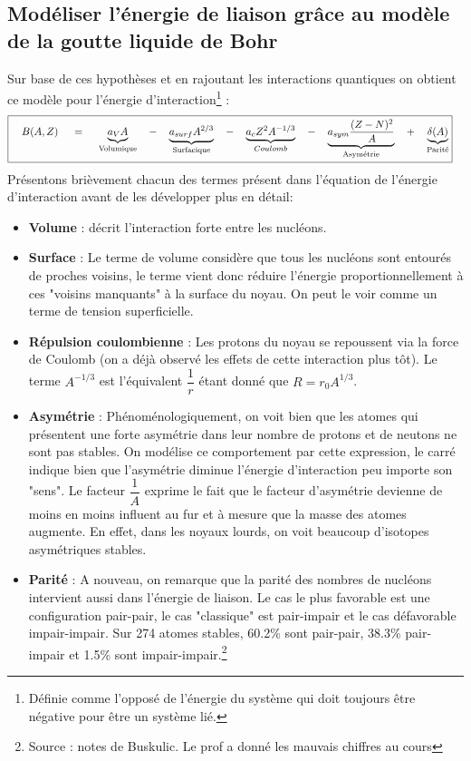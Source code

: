 \subsection{Modéliser l'énergie de liaison grâce au modèle de la goutte liquide de Bohr}



Sur base de ces hypothèses et en rajoutant les interactions quantiques on obtient ce modèle pour l'énergie d'interaction\footnote{Définie comme l'opposé de l'énergie du système qui doit toujours être négative pour être un système lié.} :
\begin{equation}
\boxed{
    \quad B(A,Z) \quad\; = \;\quad
    \underbrace{a_V A}_{\text{Volumique}}
    \quad -\quad
    \underbrace{a_{surf} A^{2/3}}_{\text{Surfacique}}
    \quad-\quad
    \underbrace{a_c Z^2 A^{-1/3 }}_{Coulomb}
    \quad-\quad 
    \underbrace{a_{sym}\dfrac{(Z-N)^2}{A}}_{\text{Asymétrie}}
    \quad+\quad 
    \underbrace{\delta(A)}_{\text{Parité}}}\quad
    \label{B}
\end{equation}
Présentons brièvement chacun des termes présent dans l'équation de l'énergie d'interaction avant de les développer plus en détail:
\begin{itemize}[label = $\bullet$]
    \item \textbf{Volume} : décrit l'interaction forte entre les nucléons.
    
    \item \textbf{Surface} : Le terme de volume considère que tous les nucléons sont entourés de proches voisins, le terme vient donc réduire l'énergie proportionnellement à ces "voisins manquants" à la surface du noyau. On peut le voir comme un terme de tension superficielle.
    
    \item \textbf{Répulsion coulombienne} : Les protons du noyau se repoussent via la force de Coulomb (on a déjà observé les effets de cette interaction plus tôt). Le terme $A^{-1/3}$ est l'équivalent $\dfrac{1}{r}$ étant donné que $R=r_0A^{1/3}$.
    
    \item \textbf{Asymétrie} : Phénoménologiquement, on voit bien que les atomes qui présentent une  forte asymétrie dans leur nombre de protons et de neutons ne sont pas stables. On modélise ce comportement par cette expression, le carré indique bien que l'asymétrie diminue l'énergie d'interaction peu importe son "sens". Le facteur $\dfrac{1}{A}$ exprime le fait que le facteur d'asymétrie devienne de moins en moins influent au fur et à mesure que la masse des atomes augmente. En effet, dans les noyaux lourds, on voit beaucoup d'isotopes asymétriques stables.
    
    \item \textbf{Parité} : A nouveau, on remarque que la parité des nombres de nucléons intervient aussi dans l'énergie de liaison. Le cas le plus favorable est une configuration pair-pair, le cas "classique" est pair-impair et le cas défavorable impair-impair. Sur 274 atomes stables, 60.2\% sont pair-pair, 38.3\% pair-impair et 1.5\% sont impair-impair.\footnote{Source : notes de Buskulic. Le prof a donné les mauvais chiffres au cours}
\end{itemize}

